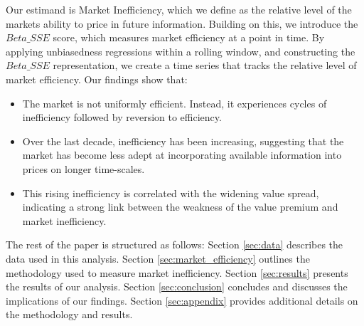 Our estimand is Market Inefficiency, which we define as the relative level of the markets ability to price in future information.
Building on this, we introduce the \textit{$Beta\_SSE$} score, which measures market efficiency at a point in time. 
By applying unbiasedness regressions within a rolling window, and constructing the \textit{$Beta\_SSE$} representation, we create a time series that tracks the relative level of market 
efficiency. \newline
\newline
Our findings show that:
\begin{itemize}
    \item The market is not uniformly efficient. Instead, it experiences cycles of inefficiency followed by reversion to efficiency.
    \item Over the last decade, inefficiency has been increasing, suggesting that the market has become less adept at incorporating available information into prices on longer time-scales.
    \item This rising inefficiency is correlated with the widening value spread, indicating a strong link between the weakness of the value premium and market inefficiency.
\end{itemize}

The rest of the paper is structured as follows: Section \ref{sec:data} describes the data used in this analysis. Section \ref{sec:market_efficiency} outlines the methodology used to measure market inefficiency.
Section \ref{sec:results} presents the results of our analysis. Section \ref{sec:conclusion} concludes and discusses the implications of our findings. 
Section \ref{sec:appendix} provides additional details on the methodology and results.